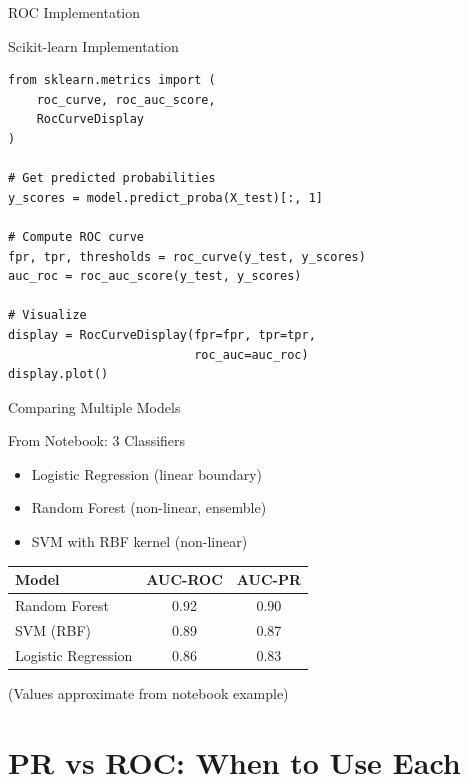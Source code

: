 \documentclass{beamer}
\begin{document}
\begin{frame}[fragile]{ROC Implementation}
\begin{block}{Scikit-learn Implementation}
\small
\begin{verbatim}
from sklearn.metrics import (
    roc_curve, roc_auc_score,
    RocCurveDisplay
)

# Get predicted probabilities
y_scores = model.predict_proba(X_test)[:, 1]

# Compute ROC curve
fpr, tpr, thresholds = roc_curve(y_test, y_scores)
auc_roc = roc_auc_score(y_test, y_scores)

# Visualize
display = RocCurveDisplay(fpr=fpr, tpr=tpr,
                          roc_auc=auc_roc)
display.plot()
\end{verbatim}
\end{block}
\end{frame}

\begin{frame}{Comparing Multiple Models}
\begin{examplebox}{From Notebook: 3 Classifiers}
\small
\begin{itemize}
    \item Logistic Regression (linear boundary)
    \item Random Forest (non-linear, ensemble)
    \item SVM with RBF kernel (non-linear)
\end{itemize}
\end{examplebox}

\vspace{0.15cm}

\begin{center}
\begin{tabular}{|l|c|c|}
\hline
\textbf{Model} & \textbf{AUC-ROC} & \textbf{AUC-PR} \\
\hline
Random Forest & 0.92 & 0.90 \\
SVM (RBF) & 0.89 & 0.87 \\
Logistic Regression & 0.86 & 0.83 \\
\hline
\end{tabular}
\end{center}

\vspace{0.2cm}

\small
(Values approximate from notebook example)
\end{frame}

\section{PR vs ROC: When to Use Each}
\end{document}
